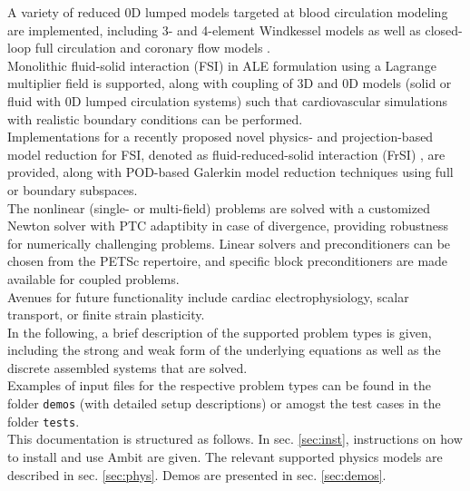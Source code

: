 \documentclass[a4paper,12pt]{report}
\begin{document}
A variety of reduced 0D lumped models targeted at blood circulation modeling are implemented, including 3- and 4-element Windkessel models \cite{westerhof2009} as well as closed-loop full circulation \cite{hirschvogel2017} and coronary flow models \cite{arthurs2016}.\\

Monolithic fluid-solid interaction (FSI) \cite{nordsletten2011} in ALE formulation using a Lagrange multiplier field is supported, along with coupling of 3D and 0D models (solid or fluid with 0D lumped circulation systems) such that cardiovascular simulations with realistic boundary conditions can be performed.\\

Implementations for a recently proposed novel physics- and projection-based model reduction for FSI, denoted as fluid-reduced-solid interaction (FrSI) \cite{hirschvogel2022preprint}, are provided, along with POD-based Galerkin model reduction techniques \cite{farhat2014} using full or boundary subspaces.\\

The nonlinear (single- or multi-field) problems are solved with a customized Newton solver with PTC \cite{gee2009} adaptibity in case of divergence, providing robustness for numerically challenging problems. Linear solvers and preconditioners can be chosen from the PETSc repertoire, and specific block preconditioners are made available for coupled problems.\\

Avenues for future functionality include cardiac electrophysiology, scalar transport, or finite strain plasticity.\\

In the following, a brief description of the supported problem types is given, including the strong and weak form of the underlying equations as well as the discrete assembled systems that are solved.\\

Examples of input files for the respective problem types can be found in the folder \verb"demos" (with detailed setup descriptions) or amogst the test cases in the folder \verb"tests".\\

This documentation is structured as follows. In sec. \ref{sec:inst}, instructions on how to install and use Ambit are given. The relevant supported physics models are described in sec. \ref{sec:phys}. Demos are presented in sec. \ref{sec:demos}.
\end{document}
